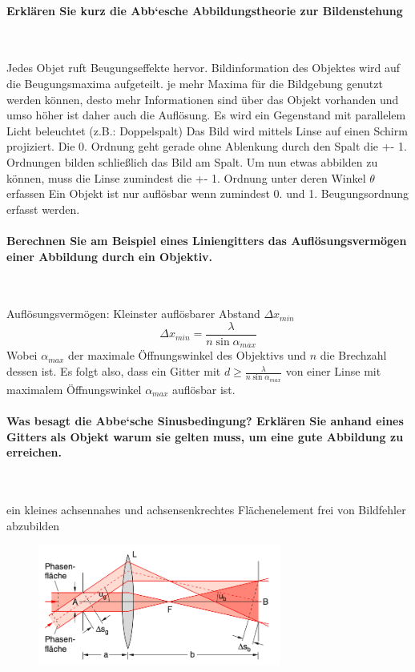 \documentclass[a4paper, 11pt, ngerman, parskip=half-]{scrartcl}
\begin{document}
\paragraph{Erklären Sie kurz die Abb‘esche Abbildungstheorie zur Bildenstehung} ~

Jedes Objet ruft Beugungseffekte hervor. Bildinformation des Objektes wird auf die Beugungsmaxima aufgeteilt. je mehr Maxima für die Bildgebung genutzt werden können, desto mehr Informationen sind über das Objekt vorhanden und umso höher ist daher auch die Auflösung.
Es wird ein Gegenstand mit parallelem Licht beleuchtet (z.B.: Doppelspalt)
Das Bild wird mittels Linse auf einen Schirm projiziert. Die 0. Ordnung geht gerade ohne Ablenkung durch den Spalt die +- 1. Ordnungen bilden schließlich das Bild am Spalt. Um nun etwas abbilden zu können, muss die Linse zumindest die +- 1. Ordnung unter deren Winkel $\theta$ erfassen
Ein Objekt ist nur auflösbar wenn zumindest 0. und 1. Beugungsordnung erfasst werden.

\paragraph{Berechnen Sie am Beispiel eines Liniengitters das Auflösungsvermögen einer Abbildung
durch ein Objektiv.} ~

Auflösungsvermögen: Kleinster auflösbarer Abstand $\Delta x_{min}$
\begin{equation}
    \Delta x_{min} = \frac{\lambda}{n \sin \alpha_{max}}
\end{equation}
Wobei $\alpha_{max}$ der maximale Öffnungswinkel des Objektivs und $n$ die Brechzahl dessen ist.
Es folgt also, dass ein Gitter mit $d \geq \frac{\lambda}{n \sin \alpha_{max}}$ von einer Linse mit maximalem Öffnungswinkel $\alpha_{max}$
auflösbar ist.

\paragraph{Was besagt die Abbe‘sche Sinusbedingung? Erklären Sie anhand eines Gitters als Objekt
warum sie gelten muss, um eine gute Abbildung zu erreichen.} ~

ein kleines achsennahes und achsensenkrechtes Flächenelement frei von Bildfehler abzubilden

\begin{figure}[H]
    \centering
    \includegraphics[width=8cm]{image/22/opt23} 
\end{figure}
\end{document}
